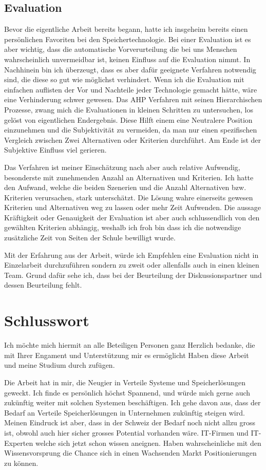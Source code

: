 \subsection*{Evaluation}
Bevor die eigentliche Arbeit bereits begann, hatte ich insgeheim bereits einen persönlichen Favoriten bei den Speichertechnologie. Bei einer Evaluation ist es aber wichtig, dass die automatische Vorverurteilung die bei uns Menschen wahrscheinlich unvermeidbar ist, keinen Einfluss auf die Evaluation nimmt. In Nachhinein bin ich überzeugt, dass es aber dafür geeignete Verfahren notwendig sind, die diese so gut wie möglichst verhindert. Wenn ich die Evaluation mit einfachen auflisten der Vor und Nachteile jeder Technologie gemacht hätte, wäre eine Verhinderung schwer gewesen. Das AHP Verfahren mit seinen Hierarchischen Prozesse, zwang mich die Evaluationen in kleinen Schritten zu untersuchen, los gelöst von eigentlichen Endergebnis. Diese Hilft einem eine Neutralere Position einzunehmen und die Subjektivität zu vermeiden, da man nur einen spezifischen Vergleich zwischen Zwei Alternativen oder Kriterien durchführt. Am Ende ist der Subjektive Einfluss viel gerieren.

Das Verfahren ist meiner Einschätzung nach aber auch relative Aufwendig, besonderste mit zunehmenden Anzahl an Alternativen und Kriterien. Ich hatte den Aufwand, welche die beiden Szenerien und die Anzahl Alternativen bzw. Kriterien verursachen, stark unterschätzt. Die Lösung wahre einerseits gewesen Kriterien und Alternativen weg zu lassen oder mehr Zeit Aufwenden. Die aussage Kräftigkeit oder Genauigkeit der Evaluation ist aber auch schlussendlich von den gewählten Kriterien abhängig, weshalb ich froh bin dass ich die notwendige zusätzliche Zeit von Seiten der Schule bewilligt wurde.

Mit der Erfahrung aus der Arbeit, würde ich Empfehlen eine Evaluation nicht in Einzelarbeit durchzuführen sondern zu zweit oder allenfalls auch in einen kleinen Team. Grund dafür sehe ich, dass bei der Beurteilung der Diskussionspartner und dessen Beurteilung fehlt.

\section{Schlusswort}
Ich möchte mich hiermit an alle Beteiligen Personen ganz Herzlich bedanke, die mit Ihrer Engament und Unterstützung mir es ermöglicht Haben diese Arbeit und meine Studium durch zufügen. 

Die Arbeit hat in mir, die Neugier in Verteile Systeme und Speicherlösungen geweckt. Ich finde es persönlich höchst Spannend, und würde mich gerne auch zukünftig weiter mit solchen Systemen beschäftigen. Ich gehe davon aus, dass der Bedarf an Verteile Speicherlösungen in Unternehmen zukünftig steigen wird. Meinen Eindruck ist aber, dass in der Schweiz der Bedarf noch nicht allzu gross ist, obwohl auch hier sicher grosses Potential vorhanden wäre. IT-Firmen und IT-Experten welche sich jetzt schon wissen aneignen. Haben wahrscheinliche mit den Wissensvorsprung die Chance sich in einen Wachsenden Markt Positionierungen zu können. 

